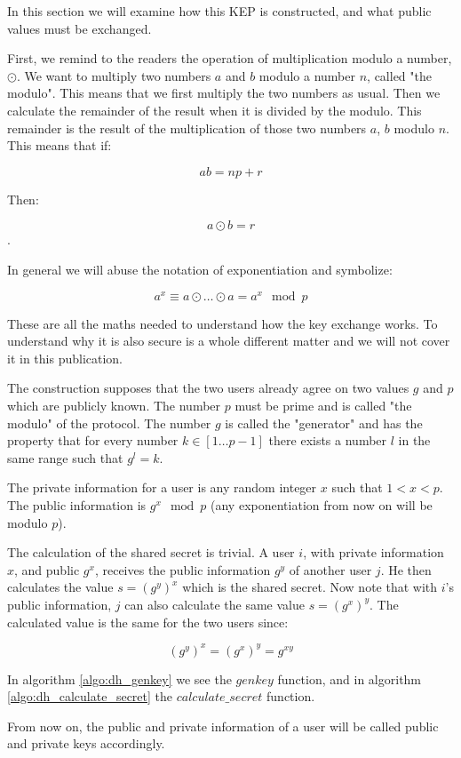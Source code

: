 In this section we will examine how this KEP is constructed, and what public values must be exchanged.

First, we remind to the readers the operation of multiplication modulo a number, $\odot$.
We want to multiply two numbers $a$ and $b$ modulo a number $n$, called "the modulo".
This means that we first multiply the two numbers as usual.
Then we calculate the remainder of the result when it is divided by the modulo.
This remainder is the result of the multiplication of those two numbers $a$, $b$ modulo $n$.
This means that if:

\[
  ab = np + r
\]

Then:

\[
  a \odot b  = r
\]
.

In general we will abuse the notation of exponentiation and symbolize:

\[
  a^x \equiv a \odot \dots \odot a = a^x \mod p
\]


These are all the maths needed to understand how the \dhname key exchange works.
To understand why it is also secure is a whole different matter and we will not cover it in this publication.

The \dhname construction supposes that the two users already agree on two values $g$ and $p$ which are publicly known.
The number $p$ must be prime and is called "the modulo" of the protocol.
The number $g$ is called the "generator" and has the property that for every number $k \in [1 \dots p-1]$ there exists a number $l$ in the same range such that $g^l = k$.

The private information for a user is any random integer $x$ such that $ 1 < x < p$.
The public information is $g^x \mod p$ (any exponentiation from now on will be modulo $p$).

The calculation of the shared secret is trivial.
A user $i$, with private information $x$, and public $g^x$, receives the public information $g^y$ of another user $j$.
He then calculates the value $s = (g^y)^x$ which is the shared secret.
Now note that with $i$'s public information, $j$ can also calculate the same value $s = (g^x)^y$.
The calculated value is the same for the two users since:

\[
  (g^y)^x = (g^x)^y = g^{xy}
\]

In algorithm \ref{algo:dh_genkey} we see the $genkey$ function, and in algorithm \ref{algo:dh_calculate_secret} the $calculate\_secret$ function.

From now on, the public and private information of a user will be called public and private keys accordingly.

